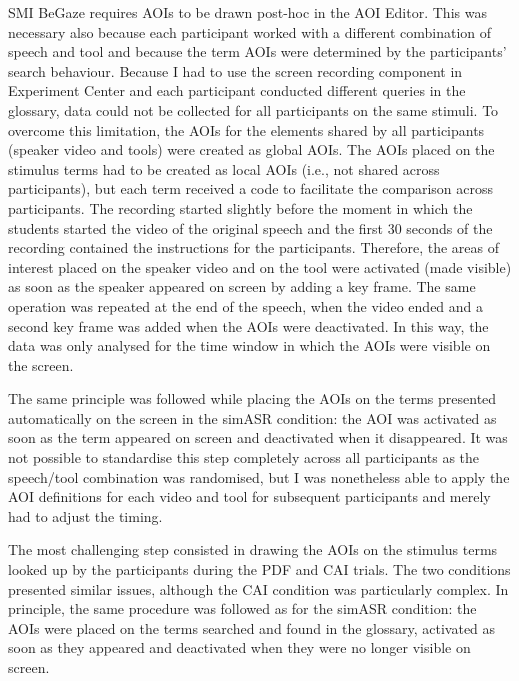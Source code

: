 SMI BeGaze requires AOIs to be drawn post-hoc in the AOI Editor. This was necessary also because each participant worked with a different combination of speech and tool and because the term AOIs were determined by the participants' search behaviour. Because I had to use the screen recording component in Experiment Center and each participant conducted different queries in the glossary, data could not be collected for all participants on the same stimuli. To overcome this limitation, the AOIs for the elements shared by all participants (speaker video and tools) were created as global AOIs. The AOIs placed on the stimulus terms had to be created as local AOIs (i.e., not shared across participants), but each term received a code to facilitate the comparison across participants. The recording started slightly before the moment in which the students started the video of the original speech and the first 30 seconds of the recording contained the instructions for the participants. Therefore, the areas of interest placed on the speaker video and on the tool were activated (made visible) as soon as the speaker appeared on screen by adding a key frame. The same operation was repeated at the end of the speech, when the video ended and a second key frame was added when the AOIs were deactivated. In this way, the data was only analysed for the time window in which the AOIs were visible on the screen.

The same principle was followed while placing the AOIs on the terms presented automatically on the screen in the simASR condition: the AOI was activated as soon as the term appeared on screen and deactivated when it disappeared. It was not possible to standardise this step completely across all participants as the speech/tool combination was randomised, but I was nonetheless able to apply the AOI definitions for each video and tool for subsequent participants and merely had to adjust the timing.

The most challenging step consisted in drawing the AOIs on the stimulus terms looked up by the participants during the PDF and CAI trials. The two conditions presented similar issues, although the CAI condition was particularly complex. In principle, the same procedure was followed as for the simASR condition: the AOIs were placed on the terms searched and found in the glossary, activated as soon as they appeared and deactivated when they were no longer visible on screen.

